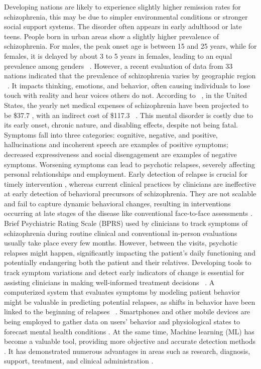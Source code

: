 Developing nations are likely to experience slightly higher remission rates for schizophrenia, this may be due to simpler environmental conditions or stronger social support systems. The disorder often appears in early adulthood or late teens. People born in urban areas show a slightly higher prevalence of schizophrenia. For males, the peak onset age is between 15 and 25 years, while for females, it is delayed by about 3 to 5 years in females, leading to an equal prevalence among genders ~\citep{pearlson2000neurobiology}. However, a recent evaluation of data from 33 nations indicated that the prevalence of schizophrenia varies by geographic region ~\citep{Rasool2018SchizophreniaAO}. It impacts thinking, emotions, and behavior, often causing individuals to lose touch with reality and hear voices others do not. According to ~\citet{pearlson2000neurobiology}, in the United States, the yearly net medical expenses of schizophrenia have been projected to be \$37.7 , with an indirect cost of \$117.3~ \citep{adler2020predicting}. This mental disorder is costly due to its early onset, chronic nature, and disabling effects, despite not being fatal. Symptoms fall into three categories: cognitive, negative, and positive, hallucinations and incoherent speech are examples of positive symptoms; decreased expressiveness and social disengagement are examples of negative symptoms. Worsening symptoms can lead to psychotic relapses, severely affecting personal relationships and employment. Early detection of relapse is crucial for timely intervention \citep{adler2020predicting}, whereas current clinical practices by clinicians are ineffective at early detection of behavioral precursors of schizophrenia. They are not scalable and fail to capture dynamic behavioral changes, resulting in interventions occurring at late stages of the disease like conventional face-to-face assessments \citep{canas2023counterfactual}. Brief Psychiatric Rating Scale (BPRS) used by clinicians to track symptoms of schizophrenia during routine clinical and conventional in-person evaluations usually take place every few months. However, between the visits, psychotic relapses might happen, significantly impacting the patient’s daily functioning and potentially endangering both the patient and their relatives. Developing tools to track symptom variations and detect early indicators of change is essential for assisting clinicians in making well-informed treatment decisions~ \citep{tseng2020using}. A computerized system that evaluates symptoms by modeling patient behavior might be valuable in predicting potential relapses, as shifts in behavior have been linked to the beginning of relapses~ \citep{zhou2022psychotic}. Smartphones and other mobile devices are being employed to gather data on users' behavior and physiological states to forecast mental health conditions \citep{tseng2020using}. At the same time, Machine learning (ML) has become a valuable tool, providing more objective and accurate detection methods \citep{thieme2020machine}. It has demonstrated numerous advantages in areas such as research, diagnosis, support, treatment, and clinical administration \citep{shatte2019machine}.  

